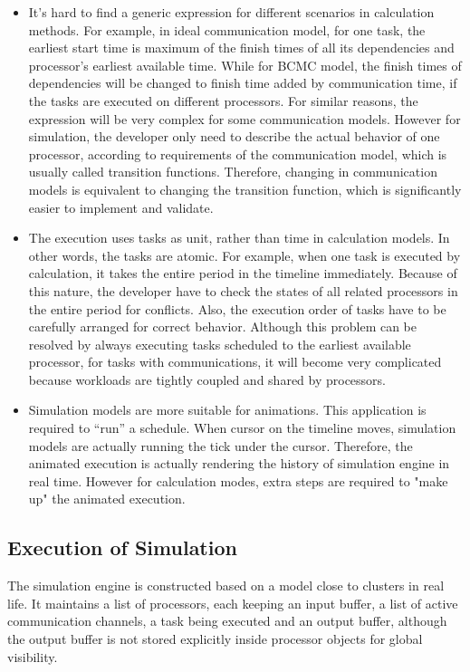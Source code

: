 \documentclass[msc,deptreport, cs]{infthesis}
\begin{document}
\begin{itemize}
  \item It's hard to find a generic expression for different scenarios in calculation methods. For example, in ideal communication model, for one task, the earliest start time is maximum of the finish times of all its dependencies and processor's earliest available time. While for BCMC model, the finish times of dependencies will be changed to finish time added by communication time, if the tasks are executed on different processors. For similar reasons, the expression will be very complex for some communication models. However for simulation, the developer only need to describe the actual behavior of one processor, according to requirements of the communication model, which is usually called transition functions. Therefore, changing in communication models is equivalent to changing the transition function, which is significantly easier to implement and validate.
  \item The execution uses tasks as unit, rather than time in calculation models. In other words, the tasks are atomic. For example, when one task is executed by calculation, it takes the entire period in the timeline immediately. Because of this nature, the developer have to check the states of all related processors in the entire period for conflicts. Also, the execution order of tasks have to be carefully arranged for correct behavior. Although this problem can be resolved by always executing tasks scheduled to the earliest available processor, for tasks with communications, it will become very complicated because workloads are tightly coupled and shared by processors.
  \item Simulation models are more suitable for animations. This application is required to ``run'' a schedule. When cursor on the timeline moves, simulation models are actually running the tick under the cursor. Therefore, the animated execution is actually rendering the history of simulation engine in real time. However for calculation modes, extra steps are required to "make up" the animated execution.
\end{itemize}

\subsection{Execution of Simulation} \label{sec:simulation}

The simulation engine is constructed based on a model close to clusters in real life. It maintains a list of processors, each keeping an input buffer, a list of active communication channels, a task being executed and an output buffer, although the output buffer is not stored explicitly inside processor objects for global visibility.
\end{document}
